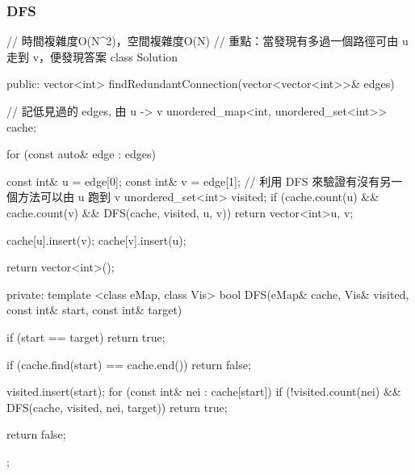 \subsubsection{DFS}
\begin{Code}
// 時間複雜度O(N^2)，空間複雜度O(N)
// 重點：當發現有多過一個路徑可由 u 走到 v，便發現答案
class Solution {
public:
    vector<int> findRedundantConnection(vector<vector<int>>& edges) {
        // 記低見過的 edges, 由 u -> v
        unordered_map<int, unordered_set<int>> cache;

        for (const auto& edge : edges)
        {
            const int& u = edge[0];
            const int& v = edge[1];
            // 利用 DFS 來驗證有沒有另一個方法可以由 u 跑到 v
            unordered_set<int> visited;
            if (cache.count(u) && cache.count(v) && DFS(cache, visited, u, v))
                return vector<int>{u, v};

            cache[u].insert(v);
            cache[v].insert(u);
        }

        return vector<int>();
    }
private:
    template <class eMap, class Vis>
        bool DFS(eMap& cache, Vis& visited, const int& start, const int& target)
    {
        if (start == target) return true;

        if (cache.find(start) == cache.end()) return false;

        visited.insert(start);
        for (const int& nei : cache[start])
            if (!visited.count(nei) && DFS(cache, visited, nei, target))
                return true;

        return false;
    }
};
\end{Code}

